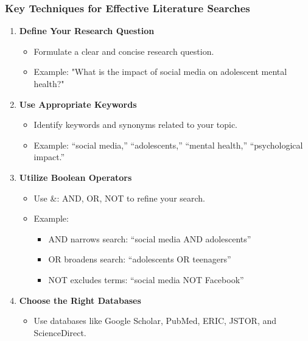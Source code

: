 \documentclass[aspectratio=169]{beamer}
\begin{document}
\begin{frame}[fragile]
    \frametitle{Key Techniques for Effective Literature Searches}
    \begin{enumerate}
        \item \textbf{Define Your Research Question}
            \begin{itemize}
                \item Formulate a clear and concise research question.
                \item Example: "What is the impact of social media on adolescent mental health?"
            \end{itemize}
        \item \textbf{Use Appropriate Keywords}
            \begin{itemize}
                \item Identify keywords and synonyms related to your topic.
                \item Example: “social media,” “adolescents,” “mental health,” “psychological impact.”
            \end{itemize}
        \item \textbf{Utilize Boolean Operators}
            \begin{itemize}
                \item Use \&: AND, OR, NOT to refine your search.
                \item Example: 
                \begin{itemize}
                    \item AND narrows search: ``social media AND adolescents''
                    \item OR broadens search: ``adolescents OR teenagers''
                    \item NOT excludes terms: ``social media NOT Facebook''
                \end{itemize}
            \end{itemize}
        \item \textbf{Choose the Right Databases}
            \begin{itemize}
                \item Use databases like Google Scholar, PubMed, ERIC, JSTOR, and ScienceDirect.
            \end{itemize}
    \end{enumerate}
\end{frame}
\end{document}
